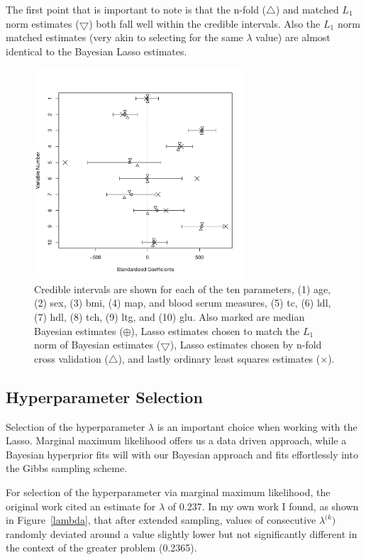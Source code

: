 \documentclass{uwstat572}
\begin{document}
The first point that is important to note is that the n-fold ($\bigtriangleup$) and matched $L_1$ norm estimates ($\bigtriangledown$) both fall well within the credible intervals. Also the $L_1$ norm matched estimates (very akin to selecting for the same $\lambda$ value) are almost identical to the Bayesian Lasso estimates. 

\begin{figure}\label{CIs}
  \centering
    \includegraphics[width=0.7\textwidth]{SaveFigure2.pdf}
  \caption{Credible intervals are shown for each of the ten parameters, (1) age, (2) sex, (3) bmi, (4) map, and blood serum measures, (5) tc, (6) ldl, (7) hdl, (8) tch, (9) ltg, and (10) glu. Also marked are median Bayesian estimates ($\oplus$), Lasso estimates chosen to match the $L_1$ norm of Bayesian estimates ($\bigtriangledown$), Lasso estimates chosen by n-fold cross validation ($\bigtriangleup$), and lastly ordinary least squares estimates ($\times$).}
\end{figure}

\subsection{Hyperparameter Selection}
Selection of the hyperparameter $\lambda$ is an important choice when working with the Lasso. Marginal maximum likelihood offers us a data driven approach, while a Bayesian hyperprior fits will with our Bayesian approach and fits effortlessly into the Gibbs sampling scheme.

For selection of the hyperparameter via marginal maximum likelihood, the original work cited an estimate for $\lambda$ of 0.237. In my own work I found, as shown in Figure~\ref{lambda}, that after extended sampling, values of consecutive $\lambda^{(k})$ randomly deviated around a value slightly lower but not significantly different in the context of the greater problem (0.2365).
\end{document}
